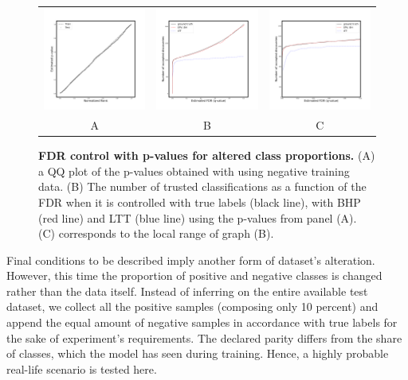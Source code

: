 \documentclass{article}
\begin{document}
\begin{figure}
    \centering
        \begin{tabular}{ccc}
 		\includegraphics[width=2in]{img/cnn_QQ_balanced.png} &
		\includegraphics[width=2in]{img/cnn_balanced_fdr_control.png} & 
		\includegraphics[width=2in]{img/cnn_balanced_fdr_control_loc.png}
		\\	
		A & B & C
	\end{tabular}
	\caption{{\bf  FDR control with p-values for altered class proportions.}
        (A) a QQ plot of the p-values obtained with using negative training data. (B) The number of trusted classifications as a function of the FDR when it is controlled with true labels (black line), with BHP (red line) and LTT (blue line) using the p-values from panel (A).
        (C) corresponds to the local range of graph (B).}
	\label{fig:balanced}
\end{figure}

Final conditions to be described imply another form of dataset's alteration. However, this time the proportion of positive and negative classes is changed rather than the data itself. Instead of inferring on the entire available test dataset, we collect all the positive samples (composing only 10 percent) and append the equal amount of negative samples in accordance with true labels for the sake of experiment's requirements. The declared parity differs from the share of classes, which the model has seen during training. Hence, a highly probable real-life scenario is tested here.
\end{document}
